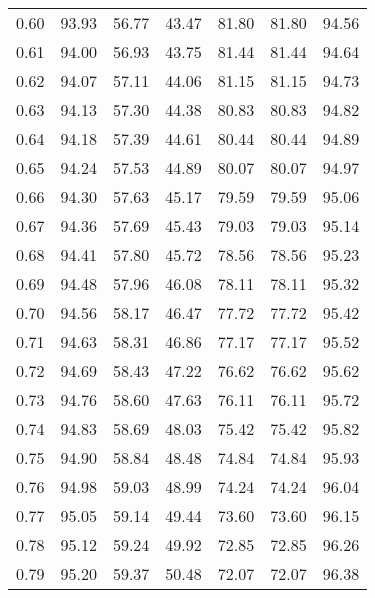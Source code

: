 \begin{tabular}{|c|c|c|c|c|c|c|}
      0.60 &     93.93 &     56.77 &      43.47 &   81.80 &      81.80 &         94.56 \\
      0.61 &     94.00 &     56.93 &      43.75 &   81.44 &      81.44 &         94.64 \\
      0.62 &     94.07 &     57.11 &      44.06 &   81.15 &      81.15 &         94.73 \\
      0.63 &     94.13 &     57.30 &      44.38 &   80.83 &      80.83 &         94.82 \\
      0.64 &     94.18 &     57.39 &      44.61 &   80.44 &      80.44 &         94.89 \\
      0.65 &     94.24 &     57.53 &      44.89 &   80.07 &      80.07 &         94.97 \\
      0.66 &     94.30 &     57.63 &      45.17 &   79.59 &      79.59 &         95.06 \\
      0.67 &     94.36 &     57.69 &      45.43 &   79.03 &      79.03 &         95.14 \\
      0.68 &     94.41 &     57.80 &      45.72 &   78.56 &      78.56 &         95.23 \\
      0.69 &     94.48 &     57.96 &      46.08 &   78.11 &      78.11 &         95.32 \\
      0.70 &     94.56 &     58.17 &      46.47 &   77.72 &      77.72 &         95.42 \\
      0.71 &     94.63 &     58.31 &      46.86 &   77.17 &      77.17 &         95.52 \\
      0.72 &     94.69 &     58.43 &      47.22 &   76.62 &      76.62 &         95.62 \\
      0.73 &     94.76 &     58.60 &      47.63 &   76.11 &      76.11 &         95.72 \\
      0.74 &     94.83 &     58.69 &      48.03 &   75.42 &      75.42 &         95.82 \\
      0.75 &     94.90 &     58.84 &      48.48 &   74.84 &      74.84 &         95.93 \\
      0.76 &     94.98 &     59.03 &      48.99 &   74.24 &      74.24 &         96.04 \\
      0.77 &     95.05 &     59.14 &      49.44 &   73.60 &      73.60 &         96.15 \\
      0.78 &     95.12 &     59.24 &      49.92 &   72.85 &      72.85 &         96.26 \\
      0.79 &     95.20 &     59.37 &      50.48 &   72.07 &      72.07 &         96.38 \\

\end{tabular}
